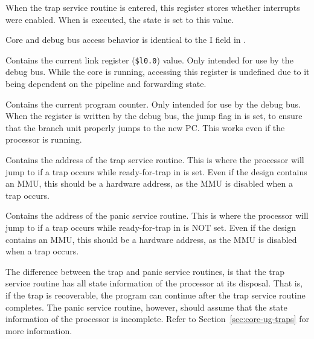\debugCanWrite{}
\coreCanWrite{}
When the trap service routine is entered, this register stores whether 
interrupts were enabled. When  is executed, the state is set to this
value.

Core and debug bus access behavior is identical to the I field in .


Contains the current link register (\texttt{\$l0.0}) value. Only intended for
use by the debug bus. While the core is running, accessing this register is
undefined due to it being dependent on the pipeline and forwarding state.

\debugCanWrite{}


Contains the current program counter. Only intended for use by the debug bus.
When the register is written by the debug bus, the jump flag in  is
set, to ensure that the branch unit properly jumps to the new PC. This works
even if the processor is running.

\debugCanWrite{}


Contains the address of the trap service routine. This is where the processor
will jump to if a trap occurs while ready-for-trap in  is set. Even if
the design contains an MMU, this should be a hardware address, as the MMU is
disabled when a trap occurs.

\debugCanWrite{}
\coreCanWrite{}


Contains the address of the panic service routine. This is where the processor
will jump to if a trap occurs while ready-for-trap in  is NOT set.
Even if the design contains an MMU, this should be a hardware address, as the
MMU is disabled when a trap occurs.

The difference between the trap and panic service routines, is that the trap
service routine has all state information of the processor at its disposal. That
is, if the trap is recoverable, the program can continue after the trap service
routine completes. The panic service routine, however, should assume that the
state information of the processor is incomplete. Refer to
Section~\ref{sec:core-ug-traps} for more information.

